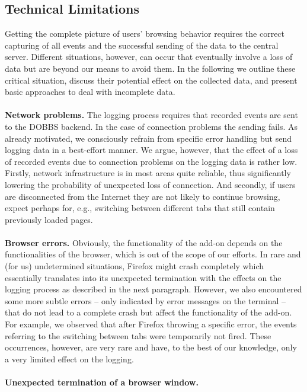 \documentclass[11pt,fleqn,twoside]{article}
\begin{document}
\subsection{Technical Limitations}
\label{sec:limitations}
Getting the complete picture of users' browsing behavior requires the correct capturing of all events and the successful sending of the data to the central server. Different situations, however, can occur that eventually involve a loss of data but are beyond our means to avoid them. In the following we outline these critical situation, discuss their potential effect on the collected data, and present basic approaches to deal with incomplete data.
\\
\\
\textbf{Network problems.} 
The logging process requires that recorded events are sent to the DOBBS backend. In the case of connection problems the sending fails. As already motivated, we consciously refrain from specific error handling but send logging data in a best-effort manner. We argue, however, that the effect of a loss of recorded events due to connection problems on the logging data is rather low. Firstly, network infrastructure is in most areas quite reliable, thus significantly lowering the probability of unexpected loss of connection. And secondly, if users are disconnected from the Internet they are not likely to continue browsing, expect perhaps for, e.g., switching between different tabs that still contain previously loaded pages.
\\
\\
\textbf{Browser errors.}
Obviously, the functionality of the add-on depends on the functionalities of the browser, which is out of the scope of our efforts. In rare and (for us) undetermined situations, Firefox might crash completely which essentially translates into its unexpected termination with the effects on the logging process as described in the next paragraph. However, we also encountered some more subtle errors -- only indicated by error messages on the terminal -- that do not lead to a complete crash but affect the functionality of the add-on. For example, we observed that after Firefox throwing a specific error, the events referring to the switching between tabs were temporarily not fired. These occurrences, however, are very rare and have, to the best of our knowledge, only a very limited effect on the logging.
\\
\\
\textbf{Unexpected termination of a browser window.} 
\end{document}
